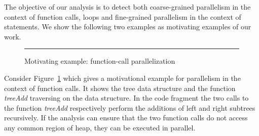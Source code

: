 The objective of our analysis is to detect both coarse-grained parallelism 
in the context of function calls, loops and fine-grained parallelism in the 
context of statements. We show the following two examples as motivating 
examples of our work.
\begin{figure}[t]
  \begin{center}
  
  \end{center}
  \hrule
  \caption{\label{fig:motiv1} Motivating example: function-call parallelization}
\end{figure}
\begin{example}{\rm 
Consider Figure~\ref{fig:motiv1} which gives a motivational 
example for parallelism in the context of function calls. It shows 
the tree data 
structure and the function \emph{treeAdd} traversing on the 
data structure. In the code fragment the two calls to the function 
\emph{treeAdd} respectively perform the additions of left and right 
subtrees recursively. If the analysis can ensure that the two function calls 
do not access any common region of heap, they can be executed in parallel.
} 
\hfill\psframebox{}  
\end{example}
